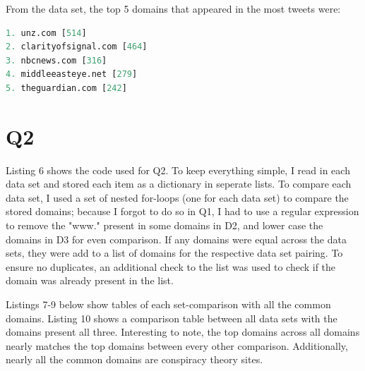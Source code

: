 \documentclass[12pt]{article}
\begin{document}
From the data set, the top 5 domains that appeared in the most tweets were:
\begin{lstlisting}[language=Python, caption={Top 5 domains with most tweets}, label=lst:copy]
1. unz.com [514]
2. clarityofsignal.com [464]
3. nbcnews.com [316]
4. middleeasteye.net [279]
5. theguardian.com [242]
\end{lstlisting}

\section*{Q2}

Listing 6 shows the code used for Q2. To keep everything simple, I read in each data set and stored each item as a dictionary in seperate lists. To compare each data set, I used a set of nested for-loops (one for each data set) to compare the stored domains; because I forgot to do so in Q1, I had to use a regular expression to remove the "www." present in some domains in D2, and lower case the domains in D3 for even comparison. If any domains were equal across the data sets, they were add to a list of domains for the respective data set pairing. To ensure no duplicates, an additional check to the list was used to check if the domain was already present in the list.



Listings 7-9 below show tables of each set-comparison with all the common domains. Listing 10 shows a comparison table between all data sets with the domains present all three. Interesting to note, the top domains across all domains nearly matches the top domains between every other comparison. Additionally, nearly all the common domains are conspiracy theory sites.
\end{document}
